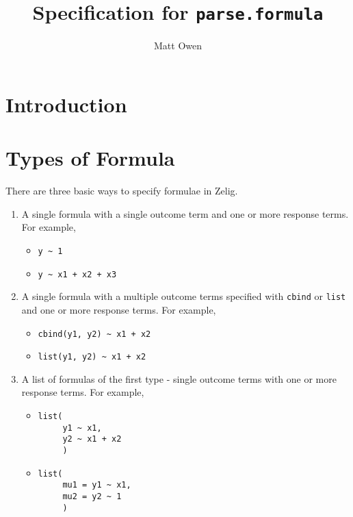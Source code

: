 \documentclass{article}
\title{Specification for {\tt parse.formula}}
\author{Matt Owen}
\begin{document}
\maketitle


\section{Introduction}

\section{Types of Formula}

There are three basic ways to specify formulae in Zelig.

\begin{enumerate}

  \item A single formula with a single outcome term and one or more 
    response terms. For example, 
    \begin{itemize}
      \item {\tt y \~{} 1}
      \item {\tt y \~{} x1 + x2 + x3}
    \end{itemize}

  \item A single formula with a multiple outcome terms specified with 
    {\tt cbind} or {\tt list} and one or more response terms. For example,
    \begin{itemize}
      \item {\tt cbind(y1, y2) \~{} x1 + x2}
      \item {\tt list(y1, y2) \~{} x1 + x2}
    \end{itemize}

  \item A list of formulas of the first type - single outcome terms with one or
    more response terms. For example, 
    \begin{itemize}
      \item \begin{verbatim}
list(
     y1 ~ x1,
     y2 ~ x1 + x2
     )
        \end{verbatim}

      \item \begin{verbatim}
list(
     mu1 = y1 ~ x1,
     mu2 = y2 ~ 1
     )
        \end{verbatim}
    \end{itemize}

\end{enumerate}
\end{document}
